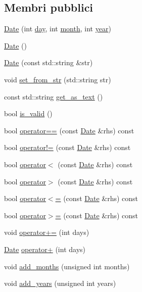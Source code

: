 \subsection*{Membri pubblici}
\begin{DoxyCompactItemize}
\item 
\hyperlink{structmm_1_1util_1_1_date_afe2513fbf246f7f3e61e7d1a06d0e6d0}{Date} (int \hyperlink{structmm_1_1util_1_1_date_a6a697c80be4f09cdb4ee400721314d87}{day}, int \hyperlink{structmm_1_1util_1_1_date_a018f3e7261b88c9a47aae5b08120b331}{month}, int \hyperlink{structmm_1_1util_1_1_date_a318909ff98468f29c7912fa9cffea079}{year})
\item 
\hyperlink{structmm_1_1util_1_1_date_a9aaf2c2d5171e081541831c4a756232e}{Date} ()
\item 
\hyperlink{structmm_1_1util_1_1_date_a9065cbdea26e95cfbb6537a5ba06f45d}{Date} (const std\+::string \&str)
\item 
void \hyperlink{structmm_1_1util_1_1_date_a9140b9c53f02f7385af15684c81c5ed0}{set\+\_\+from\+\_\+str} (std\+::string str)
\item 
const std\+::string \hyperlink{structmm_1_1util_1_1_date_aa32e7e2771581a860a49a59cdbcec8f8}{get\+\_\+as\+\_\+text} ()
\item 
bool \hyperlink{structmm_1_1util_1_1_date_ae4b2c74f7e6ebfed3daaafc999af31ba}{is\+\_\+valid} ()
\item 
bool \hyperlink{structmm_1_1util_1_1_date_a55071cbbf31cd8956cd4a7d5116e0d95}{operator==} (const \hyperlink{structmm_1_1util_1_1_date}{Date} \&rhs) const
\item 
bool \hyperlink{structmm_1_1util_1_1_date_a9f2556bcc1150f5542d59b2f9078ee1b}{operator!=} (const \hyperlink{structmm_1_1util_1_1_date}{Date} \&rhs) const
\item 
bool \hyperlink{structmm_1_1util_1_1_date_acb395628bc3074f0f5f782e39f7ecbbf}{operator$<$} (const \hyperlink{structmm_1_1util_1_1_date}{Date} \&rhs) const
\item 
bool \hyperlink{structmm_1_1util_1_1_date_a5b070fd2cd4a72cf74849abd9244b6d3}{operator$>$} (const \hyperlink{structmm_1_1util_1_1_date}{Date} \&rhs) const
\item 
bool \hyperlink{structmm_1_1util_1_1_date_aec9077b20de935d88cc03e4c454915a3}{operator$<$=} (const \hyperlink{structmm_1_1util_1_1_date}{Date} \&rhs) const
\item 
bool \hyperlink{structmm_1_1util_1_1_date_ab0dc9872f7646c748d492afcff696a0d}{operator$>$=} (const \hyperlink{structmm_1_1util_1_1_date}{Date} \&rhs) const
\item 
void \hyperlink{structmm_1_1util_1_1_date_a9aecce8821f2448c0d2d36a5fbf455b1}{operator+=} (int days)
\item 
\hyperlink{structmm_1_1util_1_1_date}{Date} \hyperlink{structmm_1_1util_1_1_date_a36a932c021e6e5e9ebed44752b78fd7c}{operator+} (int days)
\item 
void \hyperlink{structmm_1_1util_1_1_date_ae875de5d40ab9dfa1f1e22cb8a847b60}{add\+\_\+months} (unsigned int months)
\item 
void \hyperlink{structmm_1_1util_1_1_date_a5ca08a73148a58f47847a30040eee70b}{add\+\_\+years} (unsigned int years)
\end{DoxyCompactItemize}
